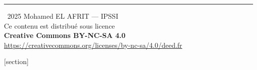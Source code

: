 {\begin{center}
        {\color{ipssiBleu}\rule{0.4\textwidth}{0.5pt}}\par
        \vspace{8pt}
        {\small\sffamily
            \textcopyright\ 2025 Mohamed EL AFRIT — IPSSI\\[2pt]
            Ce contenu est distribué sous licence\\[2pt]
            \textbf{Creative Commons BY-NC-SA 4.0}\\[2pt]
            \url{https://creativecommons.org/licenses/by-nc-sa/4.0/deed.fr}
        }\par
    \end{center}
    \newpage
}


\newcommand{\starfull}[1]{\textcolor{#1}{$\bigstar$}}
\newcommand{\starempty}{\textcolor{gray!40}{$\bigstar$}}

\newcommand{\exofondamental}{%
    \starfull{ipssiVert}\starempty\starempty\enspace%
    {\small\sffamily\textcolor{ipssiVert}{\textbf{Fondamental}}}%
}

\newcommand{\exointermediaire}{%
    \starfull{ipssiOrange}\starfull{ipssiOrange}\starempty\enspace%
    {\small\sffamily\textcolor{ipssiOrange}{\textbf{Interm\'{e}diaire}}}%
}

\newcommand{\exoavance}{%
    \starfull{ipssiRouge}\starfull{ipssiRouge}\starfull{ipssiRouge}\enspace%
    {\small\sffamily\textcolor{ipssiRouge}{\textbf{Avanc\'{e}}}}%
}

[section]
\newcommand{\exercice}[1]{%
    \stepcounter{exocount}%
    \vspace{8pt}%
    \noindent\textbf{\sffamily Exercice \theexocount}\enspace — \enspace #1\par
    \vspace{4pt}%
}


\newcommand{\separateur}{%
    \vspace{6pt}
    \begin{center}
        {\color{ipssiBleu!30}\rule{0.3\textwidth}{0.5pt}}
    \end{center}
    \vspace{6pt}
}

